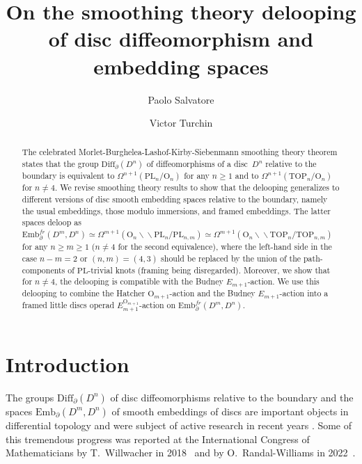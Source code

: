 \documentclass[11pt]{amsart}
\title[Smoothing theory delooping of disc diffeomorphism and embedding spaces]{On the smoothing theory delooping of disc diffeomorphism and embedding spaces}
\author{Paolo Salvatore}
\author{Victor Turchin}
\theoremstyle{definition}
\newcommand{\Embmn}{\mathrm{Emb}_\partial(D^m,D^n)}
\newcommand{\Embfrmn}{\mathrm{Emb}_\partial^{fr}(D^m,D^n)}
\newcommand{\Diffn}{\mathrm{Diff}_\partial(D^n)}
\newcommand{\PL}{\mathrm{PL}}
\newcommand{\TOP}{\mathrm{TOP}}
\newcommand{\OO}{\mathrm{O}}
\newcommand{\bbslash}{\backslash\!\!\backslash}
\numberwithin{equation}{section}
\begin{document}
\sloppy

\begin{abstract}
The celebrated Morlet-Burghelea-Lashof-Kirby-Siebenmann smoothing theory theorem states that the group $\Diffn$  of  diffeomorphisms of a disc~$D^n$ relative to the boundary is equivalent to $\Omega^{n+1}\left(\PL_n/\OO_n\right)$ for any $n\geq 1$ and to $\Omega^{n+1}\left(\TOP_n/\OO_n\right)$ for $n\neq 4$. We revise smoothing theory results to show that the delooping generalizes to different versions of  disc smooth embedding spaces relative to the boundary, namely the usual embeddings, those modulo immersions, and framed embeddings.
The latter spaces deloop as 
$\Embfrmn\simeq\Omega^{m+1}\left(\OO_n\bbslash\PL_n/\PL_{n,m}\right)\simeq \Omega^{m+1}\left(\OO_n\bbslash\TOP_n/\TOP_{n,m}\right)$ for
 any $n\geq m\geq 1$ ($n\neq 4$ for the second equivalence), where the left-hand side in the case $n-m=2$ or $(n,m)=(4,3)$ should be
  replaced by the union of the path-components of $\PL$-trivial knots (framing being disregarded). Moreover, we show that for $n\neq 4$, the delooping is compatible with the Budney $E_{m+1}$-action. We use this delooping to combine the Hatcher $\OO_{m+1}$-action and the Budney $E_{m+1}$-action into a framed little discs operad $E_{m+1}^{\OO_{m+1}}$-action on  $\Embfrmn$.



\end{abstract}

\maketitle

\section{Introduction}\label{s:intro}
The groups $\Diffn$ of disc diffeomorphisms
relative to the boundary %
 and the spaces $\Embmn$ of smooth embeddings of discs are important objects in differential topology and were 
subject of active research in recent years \cite{AT1,BW_conf_cat,Budney_cubes,Budney_family,Budney_splicing,DT,FTW,KraRand,Kupers,KupRand,Randal_diff,Sakai,SakWat,Watanabe,WeissRationalP,Will,Yoshioka}. 
Some of this tremendous progress was reported at the International Congress of Mathematicians  by T.~Willwacher in 2018~\cite{Will}  and by O.~Randal-Williams in 2022~\cite{Randal_diff}.
\end{document}
